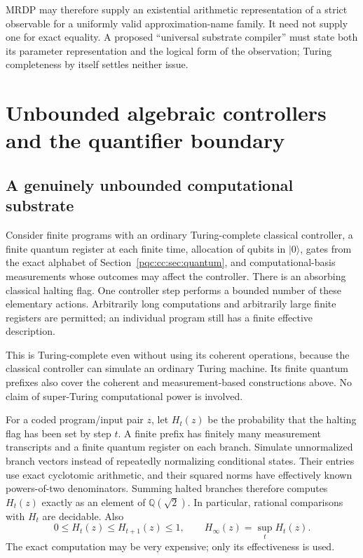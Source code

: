 \documentclass[11pt,letterpaper]{article}
\numberwithin{equation}{section}
\theoremstyle{definition}
\theoremstyle{remark}
\newcommand{\Q}{\mathbb Q}
\newcommand{\srcmark}[1]{\par\noindent{\small\itshape [source~#1]}\par}
\newcommand{\ket}[1]{\lvert #1\rangle}
\begin{document}
MRDP may therefore supply an existential arithmetic representation of a strict
observable for a uniformly valid approximation-name family. It need not supply
one for exact equality. A proposed ``universal substrate compiler'' must state
both its parameter representation and the logical form of the observation;
Turing completeness by itself settles neither issue.

\section{Unbounded algebraic controllers and the quantifier boundary}
\label{pqc:cc:sec:unbounded}
\srcmark{10}

\subsection{A genuinely unbounded computational substrate}

Consider finite programs with an ordinary Turing-complete classical controller,
a finite quantum register at each finite time, allocation of qubits in
$\ket0$, gates from the exact alphabet of Section~\ref{pqc:cc:sec:quantum}, and
computational-basis measurements whose outcomes may affect the controller.
There is an absorbing classical halting flag. One controller step performs a
bounded number of these elementary actions. Arbitrarily long computations and
arbitrarily large finite registers are permitted; an individual program still
has a finite effective description.

This is Turing-complete even without using its coherent operations, because the
classical controller can simulate an ordinary Turing machine. Its finite quantum
prefixes also cover the coherent and measurement-based constructions above.
No claim of super-Turing computational power is involved.

For a coded program/input pair $z$, let $H_t(z)$ be the probability that the
halting flag has been set by step $t$. A finite prefix has finitely many
measurement transcripts and a finite quantum register on each branch. Simulate
unnormalized branch vectors instead of repeatedly normalizing conditional
states. Their entries use exact cyclotomic arithmetic, and their squared norms
have effectively known powers-of-two denominators. Summing halted branches
therefore computes $H_t(z)$ exactly as an element of $\Q(\sqrt2)$. In
particular, rational comparisons with $H_t$ are decidable. Also
\begin{equation}
 0\le H_t(z)\le H_{t+1}(z)\le1,\qquad
 H_\infty(z)=\sup_t H_t(z).
\label{pqc:cc:eq:haltlimit}
\end{equation}
The exact computation may be very expensive; only its effectiveness is used.
\end{document}
